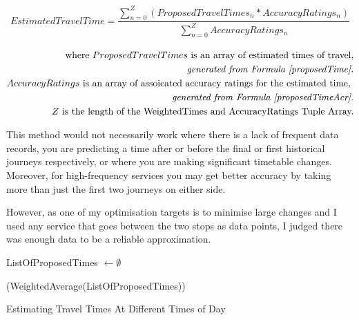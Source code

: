 \documentclass{article}
\begin{document}
\begin{gather}
	EstimatedTravelTime = \dfrac{\sum^{Z}_{n=0} (ProposedTravelTimes_n * AccuracyRatings_n) }{\sum^{Z}_{n=0} AccuracyRatings_n}
\end{gather}


\begin{align*}
	\text{where~$ProposedTravelTimes$ is an array of estimated times of travel,} \\
	\textit{ generated from Formula \ref{proposedTime}.} \\
	\text{$AccuracyRatings$ is an array of assoicated accuracy ratings for the estimated time, } \\
	\textit{generated from Formula \ref{proposedTimeAcr}.} \\
	\text{$Z$ is the length of the WeightedTimes and AccuracyRatings Tuple Array.} \\
\end{align*}


\par 
This method would not necessarily work where there is a lack of frequent data records, you are predicting a time after or before the final or first historical journeys respectively, or where you are making significant timetable changes. Moreover, for high-frequency services you may get better accuracy by taking more than just the first two journeys on either side.

\par 
However, as one of my optimisation targets is to minimise large changes and I used any service that goes between the two stops as data points, I judged there was enough data to be a reliable approximation. 


\begin{algorithm}[H]
	\SetAlgoLined
	
	
	ListOfProposedTimes $\gets \emptyset$ 


	\KwRet(WeightedAverage(ListOfProposedTimes))
	
	\caption{Estimating Travel Times At Different Times of Day}
\end{algorithm}
\end{document}
